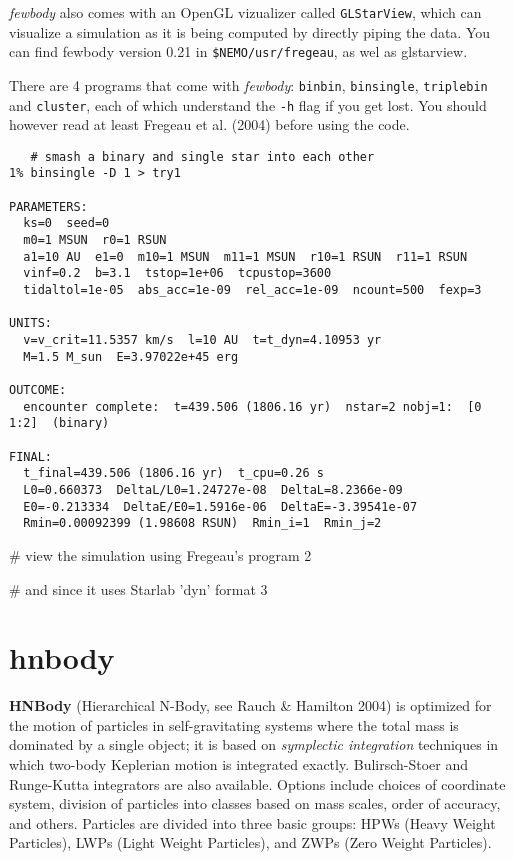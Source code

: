{\it fewbody} also comes with an OpenGL vizualizer called {\tt GLStarView},
which can visualize a simulation as it is being computed by directly
piping the data. You can find fewbody  version 0.21 in {\tt \$NEMO/usr/fregeau},
as wel as glstarview.

There are  4 programs that come with {\it fewbody}:
{\tt binbin}, {\tt binsingle}, {\tt triplebin} and {\tt cluster},
 each of which understand the
{\tt -h} flag if you get lost. You should however read at least
Fregeau et al. (2004) before using the code.

\footnotesize\begin{verbatim}
   # smash a binary and single star into each other
1% binsingle -D 1 > try1

PARAMETERS:
  ks=0  seed=0
  m0=1 MSUN  r0=1 RSUN
  a1=10 AU  e1=0  m10=1 MSUN  m11=1 MSUN  r10=1 RSUN  r11=1 RSUN
  vinf=0.2  b=3.1  tstop=1e+06  tcpustop=3600
  tidaltol=1e-05  abs_acc=1e-09  rel_acc=1e-09  ncount=500  fexp=3
 
UNITS:
  v=v_crit=11.5357 km/s  l=10 AU  t=t_dyn=4.10953 yr
  M=1.5 M_sun  E=3.97022e+45 erg
 
OUTCOME:
  encounter complete:  t=439.506 (1806.16 yr)  nstar=2 nobj=1:  [0 1:2]  (binary)
 
FINAL:
  t_final=439.506 (1806.16 yr)  t_cpu=0.26 s
  L0=0.660373  DeltaL/L0=1.24727e-08  DeltaL=8.2366e-09
  E0=-0.213334  DeltaE/E0=1.5916e-06  DeltaE=-3.39541e-07
  Rmin=0.00092399 (1.98608 RSUN)  Rmin_i=1  Rmin_j=2

\end{verbatim}\normalsize

   # view the simulation using Fregeau's program
2%

   # and since it uses Starlab 'dyn' format
3%



\section{hnbody}

{\bf HNBody} (Hierarchical N-Body, see Rauch \& Hamilton 2004)
is optimized for 
the motion of particles in self-gravitating systems where the total mass
is dominated by a single object; it is based on 
{\it symplectic integration} techniques 
in which two-body Keplerian motion is integrated exactly. 
Bulirsch-Stoer and Runge-Kutta integrators are also available.
Options include choices of coordinate system, division of particles into classes 
based on mass scales, order of accuracy, and others. 
Particles are divided into three basic groups:
HPWs (Heavy Weight Particles), LWPs (Light Weight Particles), and
ZWPs (Zero Weight Particles).


